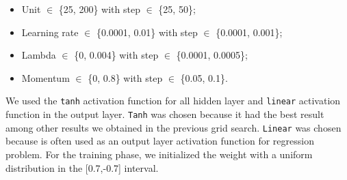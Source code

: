 \begin{itemize}
	\item Unit $\in$ \{25, 200\} with step $\in$ \{25, 50\};
	\item Learning rate $\in$ \{0.0001, 0.01\} with step $\in$ \{0.0001, 0.001\};
	\item Lambda $\in$ \{0, 0.004\} with step $\in$ \{0.0001,  0.0005\};
	\item Momentum $\in$ \{0, 0.8\} with step $\in$ \{0.05,  0.1\}.
\end{itemize}
\vspace{0.3cm}
We used the \texttt{tanh} activation function for all hidden layer and \texttt{linear} activation function in the output layer. \texttt{Tanh} was chosen because it had the best result among other results we obtained in the previous grid search. \texttt{Linear} was chosen because is often used as an output layer activation function for regression problem.
For the training phase, we initialized the weight with a uniform distribution in the [0.7,-0.7] interval.

